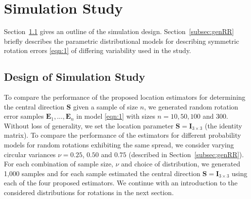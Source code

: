 \section{Simulation Study}\label{ch:simulation}

Section~\ref{subsec:simdesign} gives an outline of the simulation design.  Section~\ref{subsec:genRR} briefly describes the parametric distributional models for describing symmetric rotation errors \eqref{eqn:1} of differing variability used in the study. 
\subsection{Design of Simulation Study}
\label{subsec:simdesign}
To compare the performance of the proposed location estimators for determining the central direction $\bm{S}$ given a sample of size $n$, we generated random rotation error samples  $\bm E_1, \ldots, \bm E_n$  in model \eqref{eqn:1} with sizes $n=10, 50, 100$ and 300. Without loss of generality, we set the location parameter $\bm S=\bm I_{3\times 3}$ (the identity matrix). To compare the performance of the estimators for different probability models for random rotations exhibiting the same spread, %
we consider varying circular variances $\nu=0.25$, $0.50$ and $0.75$ (described in Section~\ref{subsec:genRR}). For each combination of sample size, $\nu$ and choice of distribution, we generated 1,000 samples and for each sample estimated the central direction  $\bm S=\bm I_{3\times 3}$ using each of the four proposed estimators.  We continue with an introduction to the considered distributions for rotations in the next section.



